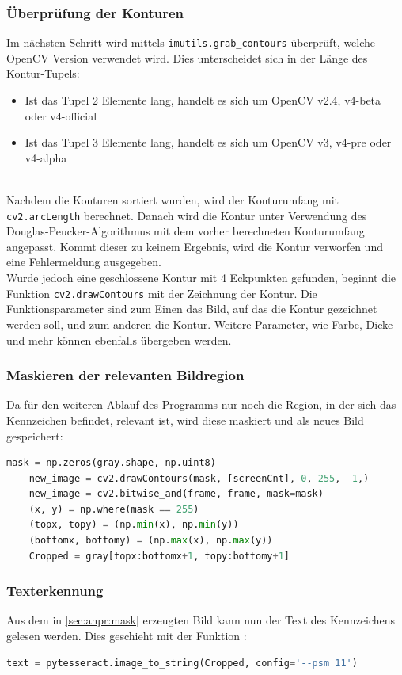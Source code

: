 \subsubsection{Überprüfung der Konturen}
Im nächsten Schritt wird mittels \verb|imutils.grab_contours| überprüft, welche OpenCV Version verwendet wird. Dies unterscheidet sich in der Länge des Kontur-Tupels:
\begin{itemize}
    \item Ist das Tupel 2 Elemente lang, handelt es sich um OpenCV v2.4, v4-beta oder v4-official
    \item Ist das Tupel 3 Elemente lang, handelt es sich um OpenCV v3, v4-pre oder v4-alpha
\end{itemize}
\cite{imutilsGrabContours}\\
Nachdem die Konturen sortiert wurden, wird der Konturumfang mit \verb|cv2.arcLength| berechnet. Danach wird die Kontur unter Verwendung des Douglas-Peucker-Algorithmus mit dem vorher berechneten Konturumfang angepasst. Kommt dieser zu keinem Ergebnis, wird die Kontur verworfen und eine Fehlermeldung ausgegeben.\\
Wurde jedoch eine geschlossene Kontur mit 4 Eckpunkten gefunden, beginnt die Funktion \verb|cv2.drawContours| mit der Zeichnung der Kontur. Die Funktionsparameter sind zum Einen das Bild, auf das die Kontur gezeichnet werden soll, und zum anderen die Kontur. Weitere Parameter, wie Farbe, Dicke und mehr können ebenfalls übergeben werden.
\cite{drawContours}
\subsubsection{Maskieren der relevanten Bildregion \label{sec:anpr:mask}}
Da für den weiteren Ablauf des Programms nur noch die Region, in der sich das Kennzeichen befindet, relevant ist, wird diese maskiert und als neues Bild gespeichert: 

\begin{lstlisting}[language=Python, caption=Maskieren der Kennzeichenregion und Abspeichern in neuem Bild, label=lst:impl:anpr:mask]
    mask = np.zeros(gray.shape, np.uint8)
    new_image = cv2.drawContours(mask, [screenCnt], 0, 255, -1,)
    new_image = cv2.bitwise_and(frame, frame, mask=mask)
    (x, y) = np.where(mask == 255)
    (topx, topy) = (np.min(x), np.min(y))
    (bottomx, bottomy) = (np.max(x), np.max(y))
    Cropped = gray[topx:bottomx+1, topy:bottomy+1]
\end{lstlisting}

\subsubsection{Texterkennung \label{sec:anpr:text}}
Aus dem in \ref{sec:anpr:mask} erzeugten Bild kann nun der Text des Kennzeichens gelesen werden. Dies geschieht mit der Funktion : 
\begin{lstlisting}[language=Python, caption=Maskieren der Kennzeichenregion und Abspeicher in neuem Bild, label=lst:impl:anpr:text]
    text = pytesseract.image_to_string(Cropped, config='--psm 11')
\end{lstlisting}

